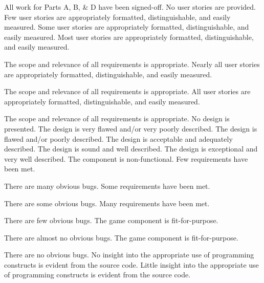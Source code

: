 \documentclass{../fal_assignment}
\begin{document}
\begin{markingrubric}
%
        \grade 		All work for Parts A, B, \& D have been signed-off.
%
        \grade\fail 	No user stories are provided.
        \grade 		Few user stories are appropriately formatted, distinguishable, and easily measured.
        \grade 		Some user stories are appropriately formatted, distinguishable, and easily measured.
        \grade 		Most user stories are appropriately formatted, distinguishable, and easily measured.
        \par 		The scope and relevance of all requirements is appropriate.
        \grade 		Nearly all user stories are appropriately formatted, distinguishable, and easily measured.
        \par 		The scope and relevance of all requirements is appropriate.
        \grade 		All user stories are appropriately formatted, distinguishable, and easily measured.
        \par 		The scope and relevance of all requirements is appropriate.
%
        \grade\fail 	No design is presented.
        \grade 		The design is very flawed and/or very poorly described.
        \grade 		The design is flawed and/or poorly described.
        \grade 		The design is acceptable and adequately described.
        \grade 		The design is sound and well described.
        \grade 		The design is exceptional and very well described.
%
        \grade\fail 	The component is non-functional.
        \grade 		Few requirements have been met.
        \par 		There are many obvious bugs.
        \grade 		Some requirements have been met.
        \par 		There are some obvious bugs.
        \grade 		Many requirements have been met.
        \par 		There are few obvious bugs.
        \grade 		The game component is fit-for-purpose.
        \par 		There are almost no obvious bugs.
        \grade 		The game component is fit-for-purpose.
        \par 		There are no obvious bugs.
%
        \grade\fail 	No insight into the appropriate use of programming constructs is evident from the source code.
        \grade 		Little insight into the appropriate use of programming constructs is evident from the source code.

\end{markingrubric}
\end{document}
